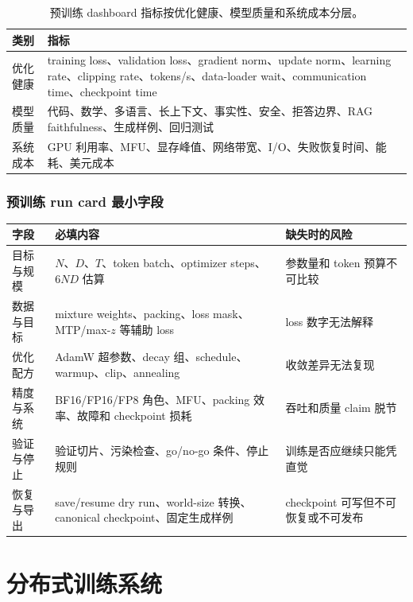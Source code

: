 \documentclass[UTF8,zihao=-4,openany]{ctexbook}
\begin{document}
\begin{table}[t]
\centering
\begin{tabular}{p{}p{}}
\toprule
类别 & 指标 \\
\midrule
优化健康 & training loss、validation loss、gradient norm、update norm、learning rate、clipping rate、tokens/s、data-loader wait、communication time、checkpoint time \\
模型质量 & 代码、数学、多语言、长上下文、事实性、安全、拒答边界、RAG faithfulness、生成样例、回归测试 \\
系统成本 & GPU 利用率、MFU、显存峰值、网络带宽、I/O、失败恢复时间、能耗、美元成本 \\
\bottomrule
\end{tabular}
\caption{预训练 dashboard 指标按优化健康、模型质量和系统成本分层。}
\label{tab:zh-pretraining-dashboard}
\end{table}

\subsection{预训练 run card 最小字段}
\begin{center}
\begin{tabular}{p{}p{}p{}}
\toprule
字段 & 必填内容 & 缺失时的风险 \\
\midrule
目标与规模 & $N$、$D$、$T$、token batch、optimizer steps、$6ND$ 估算 & 参数量和 token 预算不可比较 \\
数据与目标 & mixture weights、packing、loss mask、MTP/max-$z$ 等辅助 loss & loss 数字无法解释 \\
优化配方 & AdamW 超参数、decay 组、schedule、warmup、clip、annealing & 收敛差异无法复现 \\
精度与系统 & BF16/FP16/FP8 角色、MFU、packing 效率、故障和 checkpoint 损耗 & 吞吐和质量 claim 脱节 \\
验证与停止 & 验证切片、污染检查、go/no-go 条件、停止规则 & 训练是否应继续只能凭直觉 \\
恢复与导出 & save/resume dry run、world-size 转换、canonical checkpoint、固定生成样例 & checkpoint 可写但不可恢复或不可发布 \\
\bottomrule
\end{tabular}
\end{center}

\chapter{分布式训练系统}
\end{document}
